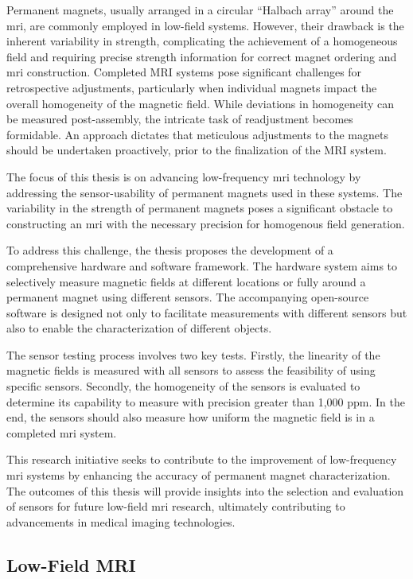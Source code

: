 Permanent magnets, usually arranged in a circular ``Halbach array''
around the \gls{mri}, are commonly employed in low-field systems.
However, their drawback is the inherent variability in strength,
complicating the achievement of a homogeneous field and requiring
precise strength information for correct magnet ordering and \gls{mri}
construction. Completed MRI systems pose significant challenges for
retrospective adjustments, particularly when individual magnets impact
the overall homogeneity of the magnetic field. While deviations in
homogeneity can be measured post-assembly, the intricate task of
readjustment becomes formidable. An approach dictates that meticulous
adjustments to the magnets should be undertaken proactively, prior to
the finalization of the MRI system.

The focus of this thesis is on advancing low-frequency \gls{mri}
technology by addressing the sensor-usability of permanent magnets used
in these systems. The variability in the strength of permanent magnets
poses a significant obstacle to constructing an \gls{mri} with the
necessary precision for homogenous field generation.

To address this challenge, the thesis proposes the development of a
comprehensive hardware and software framework. The hardware system aims
to selectively measure magnetic fields at different locations or fully
around a permanent magnet using different sensors. The accompanying
open-source software is designed not only to facilitate measurements
with different sensors but also to enable the characterization of
different objects.

The sensor testing process involves two key tests. Firstly, the
linearity of the magnetic fields is measured with all sensors to assess
the feasibility of using specific sensors. Secondly, the homogeneity of
the sensors is evaluated to determine its capability to measure with
precision greater than 1,000 \gls{ppm}. In the end, the sensors should
also measure how uniform the magnetic field is in a completed \gls{mri}
system.

This research initiative seeks to contribute to the improvement of
low-frequency \gls{mri} systems by enhancing the accuracy of permanent
magnet characterization. The outcomes of this thesis will provide
insights into the selection and evaluation of sensors for future
low-field \gls{mri} research, ultimately contributing to advancements in
medical imaging technologies.

\hypertarget{low-field-mri}{%
\subsection{Low-Field MRI}\label{low-field-mri}}

